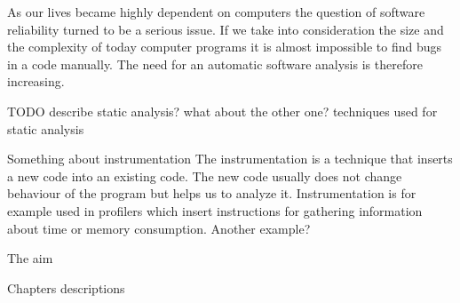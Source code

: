 As our lives became highly dependent on computers the question of software
reliability turned to be a serious issue. If we take into consideration the
size and the complexity of today computer programs it is almost impossible to
find bugs in a code manually. The need for an automatic software analysis is
therefore increasing.

TODO describe static analysis? what about the other one? techniques used for
static analysis

Something about instrumentation The instrumentation is a technique that inserts
a new code into an existing code. The new code usually does not change
behaviour of the program but helps us to analyze it. Instrumentation is for
example used in profilers which insert instructions for gathering information
about time or memory consumption. Another example?

The aim

Chapters descriptions
